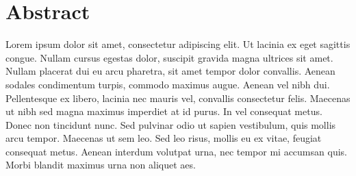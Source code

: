 \documentclass[a4paper, 12pt]{report}
\begin{document}
\chapter*{Abstract}
Lorem ipsum dolor sit amet, consectetur adipiscing elit. Ut lacinia ex eget sagittis congue.
Nullam cursus egestas dolor, suscipit gravida magna ultrices sit amet. Nullam placerat dui eu
arcu pharetra, sit amet tempor dolor convallis. Aenean sodales condimentum turpis, commodo maximus
augue. Aenean vel nibh dui. Pellentesque ex libero, lacinia nec mauris vel, convallis consectetur
felis. Maecenas ut nibh sed magna maximus imperdiet at id purus. In vel consequat metus. Donec non
tincidunt nunc. Sed pulvinar odio ut sapien vestibulum, quis mollis arcu tempor. Maecenas ut sem leo.
Sed leo risus, mollis eu ex vitae, feugiat consequat metus. Aenean interdum volutpat urna, nec
tempor mi accumsan quis. Morbi blandit maximus urna non aliquet aes.


\tableofcontents

\clearpage

\printnoidxglossaries
















\listoffigures

\end{document}
